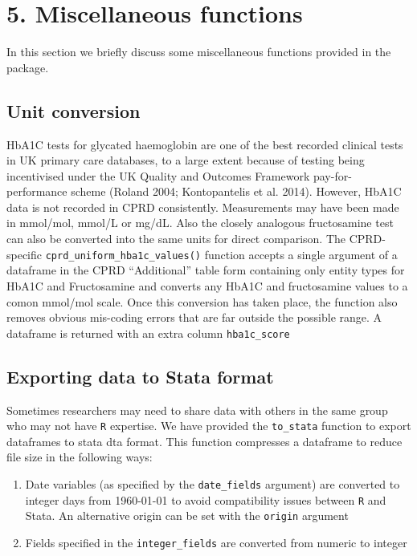\documentclass[]{article}
\begin{document}
\section{5. Miscellaneous functions}\label{miscellaneous-functions}

In this section we briefly discuss some miscellaneous functions provided
in the package.

\subsection{Unit conversion}\label{unit-conversion}

HbA1C tests for glycated haemoglobin are one of the best recorded
clinical tests in UK primary care databases, to a large extent because
of testing being incentivised under the UK Quality and Outcomes
Framework pay-for-performance scheme (Roland 2004; Kontopantelis et al.
2014). However, HbA1C data is not recorded in CPRD consistently.
Measurements may have been made in mmol/mol, mmol/L or mg/dL. Also the
closely analogous fructosamine test can also be converted into the same
units for direct comparison. The CPRD-specific
\texttt{cprd\_uniform\_hba1c\_values()} function accepts a single
argument of a dataframe in the CPRD ``Additional'' table form containing
only entity types for HbA1C and Fructosamine and converts any HbA1C and
fructosamine values to a comon mmol/mol scale. Once this conversion has
taken place, the function also removes obvious mis-coding errors that
are far outside the possible range. A dataframe is returned with an
extra column \texttt{hba1c\_score}

\subsection{Exporting data to Stata
format}\label{exporting-data-to-stata-format}

Sometimes researchers may need to share data with others in the same
group who may not have \texttt{R} expertise. We have provided the
\texttt{to\_stata} function to export dataframes to stata dta format.
This function compresses a dataframe to reduce file size in the
following ways:

\begin{enumerate}
\def\labelenumi{\arabic{enumi}.}
\itemsep1pt\parskip0pt
\item
  Date variables (as specified by the \texttt{date\_fields} argument)
  are converted to integer days from 1960-01-01 to avoid compatibility
  issues between \texttt{R} and Stata. An alternative origin can be set
  with the \texttt{origin} argument
\item
  Fields specified in the \texttt{integer\_fields} are converted from
  numeric to integer
\end{enumerate}
\end{document}
